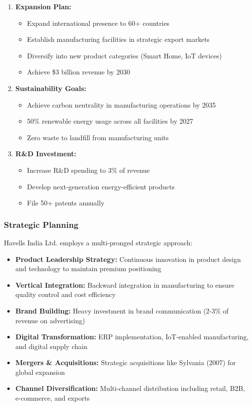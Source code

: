 \documentclass[12pt,a4paper]{article}
\begin{document}
\begin{enumerate}[leftmargin=*]
    \item \textbf{Expansion Plan:}
    \begin{itemize}
        \item Expand international presence to 60+ countries
        \item Establish manufacturing facilities in strategic export markets
        \item Diversify into new product categories (Smart Home, IoT devices)
        \item Achieve \$3 billion revenue by 2030
    \end{itemize}
    
    \item \textbf{Sustainability Goals:}
    \begin{itemize}
        \item Achieve carbon neutrality in manufacturing operations by 2035
        \item 50\% renewable energy usage across all facilities by 2027
        \item Zero waste to landfill from manufacturing units
    \end{itemize}
    
    \item \textbf{R\&D Investment:}
    \begin{itemize}
        \item Increase R\&D spending to 3\% of revenue
        \item Develop next-generation energy-efficient products
        \item File 50+ patents annually
    \end{itemize}
\end{enumerate}

\subsubsection{Strategic Planning}

Havells India Ltd. employs a multi-pronged strategic approach:

\begin{itemize}[leftmargin=*]
    \item \textbf{Product Leadership Strategy:} Continuous innovation in product design and technology to maintain premium positioning
    \item \textbf{Vertical Integration:} Backward integration in manufacturing to ensure quality control and cost efficiency
    \item \textbf{Brand Building:} Heavy investment in brand communication (2-3\% of revenue on advertising)
    \item \textbf{Digital Transformation:} ERP implementation, IoT-enabled manufacturing, and digital supply chain
    \item \textbf{Mergers \& Acquisitions:} Strategic acquisitions like Sylvania (2007) for global expansion
    \item \textbf{Channel Diversification:} Multi-channel distribution including retail, B2B, e-commerce, and exports
\end{itemize}
\end{document}
